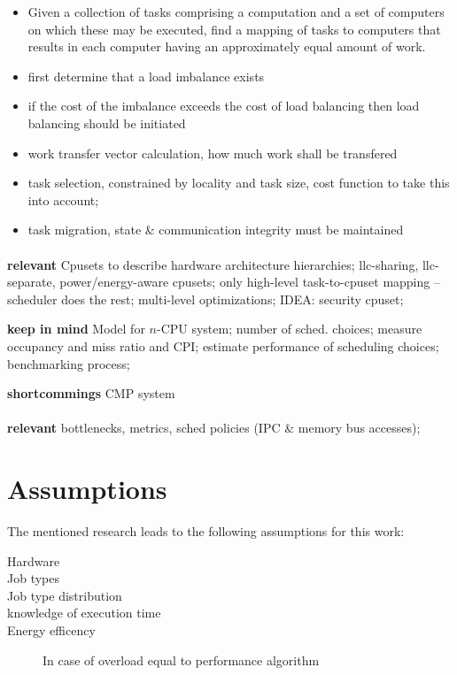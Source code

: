 \begin{itemize}
  \item Given a collection of tasks comprising a computation and a set of
computers on which these may be executed, find a mapping of tasks to computers
that results in each computer having an approximately equal amount of work.
  \item first determine that a load imbalance exists
  \item if the cost of the imbalance exceeds the cost of load balancing then
    load balancing should be initiated
  \item work transfer vector calculation, how much work shall be transfered
  \item task selection, constrained by locality and task size, cost function to
    take this into account;
  \item task migration, state \& communication integrity must be maintained
\end{itemize}


\paragraph{ \cite{banikazemi_pam_2008} }
\textbf{relevant} Cpusets to describe hardware architecture hierarchies;
\gls{llc}-sharing, \gls{llc}-separate, power/energy-aware cpusets;
only high-level task-to-cpuset mapping -- scheduler does the rest;
multi-level optimizations;
IDEA: security cpuset;

\textbf{keep in mind} Model for $n$-CPU system;
number of sched. choices;
measure occupancy and miss ratio and CPI;
estimate performance of scheduling choices;
benchmarking process;

\textbf{shortcommings} CMP system


\paragraph{ \cite{zhang_processor_2007} }
\textbf{relevant} bottlenecks, metrics, sched policies (IPC \& memory bus
accesses);



\section{Assumptions}
The mentioned research leads to the following assumptions for this work:


\begin{description}
  \item[Hardware]
  \item[Job types]
  \item[Job type distribution]
  \item[knowledge of execution time]
  \item[Energy efficency] In case of overload equal to performance algorithm

\end{description}

